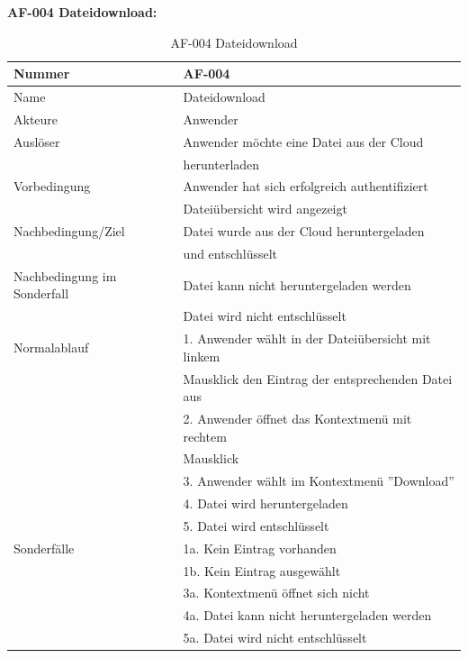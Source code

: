 \documentclass[12pt,a4paper,bibliography=totocnumbered,listof=totocnumbered]{scrartcl}
\begin{document}
\textbf{AF-004 Dateidownload:}
\begin{table}[!h]
	\centering
	\begin{tabular}{|l|l|}
		\hline
		Nummer & AF-004\\
		\hline
		Name & Dateidownload\\
		\hline
		Akteure & Anwender\\
		\hline
		Auslöser & Anwender möchte eine Datei aus der Cloud \\ & herunterladen\\
		\hline
		Vorbedingung & Anwender hat sich erfolgreich authentifiziert \\ & Dateiübersicht wird angezeigt\\
		\hline
		Nachbedingung/Ziel & Datei wurde aus der Cloud heruntergeladen \\ & und entschlüsselt \\
		\hline
		Nachbedingung im Sonderfall & Datei kann nicht heruntergeladen werden \\ & Datei wird nicht entschlüsselt\\
		\hline
		Normalablauf & 1. Anwender wählt in der Dateiübersicht mit linkem \\&Mausklick den Eintrag der entsprechenden Datei aus \\ & 2. Anwender öffnet das Kontextmenü mit rechtem\\& Mausklick \\ & 3. Anwender wählt im Kontextmenü ''Download'' \\  & 4. Datei wird heruntergeladen \\ & 5. Datei wird entschlüsselt \\
		\hline
		Sonderfälle & 1a. Kein Eintrag vorhanden\\& 1b. Kein Eintrag ausgewählt\\ & 3a. Kontextmenü öffnet sich nicht \\& 4a. Datei kann nicht heruntergeladen werden \\ & 5a. Datei wird nicht entschlüsselt\\
		\hline
	\end{tabular}
	\caption{AF-004 Dateidownload}
	\label{tab:AF-004 Dateidownload}
\end{table}
\pagebreak
\end{document}
